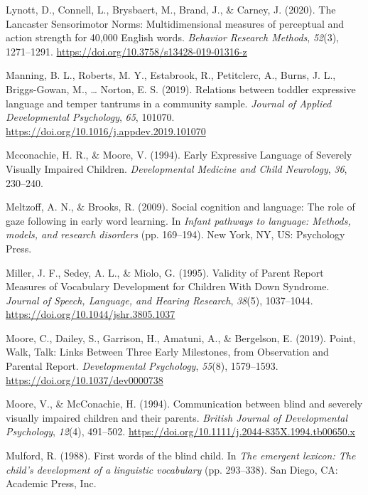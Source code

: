 \documentclass[english,man,floatsintext]{apa6}
\begin{document}
\leavevmode\hypertarget{ref-lynott2020}{}%
Lynott, D., Connell, L., Brysbaert, M., Brand, J., \& Carney, J. (2020). The Lancaster Sensorimotor Norms: Multidimensional measures of perceptual and action strength for 40,000 English words. \emph{Behavior Research Methods}, \emph{52}(3), 1271--1291. \url{https://doi.org/10.3758/s13428-019-01316-z}

\leavevmode\hypertarget{ref-manning2019}{}%
Manning, B. L., Roberts, M. Y., Estabrook, R., Petitclerc, A., Burns, J. L., Briggs-Gowan, M., \ldots{} Norton, E. S. (2019). Relations between toddler expressive language and temper tantrums in a community sample. \emph{Journal of Applied Developmental Psychology}, \emph{65}, 101070. \url{https://doi.org/10.1016/j.appdev.2019.101070}

\leavevmode\hypertarget{ref-mcconachie1994}{}%
Mcconachie, H. R., \& Moore, V. (1994). Early Expressive Language of Severely Visually Impaired Children. \emph{Developmental Medicine and Child Neurology}, \emph{36}, 230--240.

\leavevmode\hypertarget{ref-meltzoff2009}{}%
Meltzoff, A. N., \& Brooks, R. (2009). Social cognition and language: The role of gaze following in early word learning. In \emph{Infant pathways to language: Methods, models, and research disorders} (pp. 169--194). New York, NY, US: Psychology Press.

\leavevmode\hypertarget{ref-miller1995}{}%
Miller, J. F., Sedey, A. L., \& Miolo, G. (1995). Validity of Parent Report Measures of Vocabulary Development for Children With Down Syndrome. \emph{Journal of Speech, Language, and Hearing Research}, \emph{38}(5), 1037--1044. \url{https://doi.org/10.1044/jshr.3805.1037}

\leavevmode\hypertarget{ref-moore2019}{}%
Moore, C., Dailey, S., Garrison, H., Amatuni, A., \& Bergelson, E. (2019). Point, Walk, Talk: Links Between Three Early Milestones, from Observation and Parental Report. \emph{Developmental Psychology}, \emph{55}(8), 1579--1593. \url{https://doi.org/10.1037/dev0000738}

\leavevmode\hypertarget{ref-moore1994}{}%
Moore, V., \& McConachie, H. (1994). Communication between blind and severely visually impaired children and their parents. \emph{British Journal of Developmental Psychology}, \emph{12}(4), 491--502. \url{https://doi.org/10.1111/j.2044-835X.1994.tb00650.x}

\leavevmode\hypertarget{ref-mulford1988}{}%
Mulford, R. (1988). First words of the blind child. In \emph{The emergent lexicon: The child's development of a linguistic vocabulary} (pp. 293--338). San Diego, CA: Academic Press, Inc.
\end{document}
